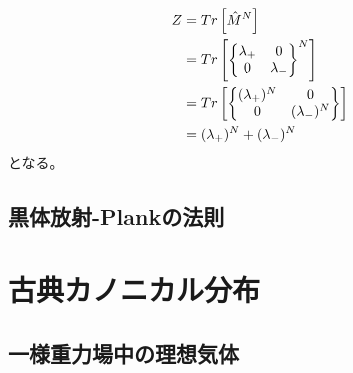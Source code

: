 \documentclass[dvipdfmx, 11pt, a4paper]{jsarticle}
\theoremstyle{definition}
\begin{document}
    \begin{align}
        Z &= Tr\left[ \hat{M}^N \right] \notag \\
        &= Tr \left[ \left\{
        \begin{matrix}
            \lambda_+ &0\\
            0&\lambda_-
        \end{matrix} 
        \right\}^N \right] \notag \\
        &= Tr \left[ \left\{
        \begin{matrix}
            (\lambda_+)^N &0\\
            0&(\lambda_-)^N
        \end{matrix} 
        \right\} \right] \notag \\
        &= (\lambda_+)^N + (\lambda_-)^N
    \end{align}
    となる。
\subsection{黒体放射-Plankの法則}
\section{古典カノニカル分布}
\subsection{一様重力場中の理想気体}
\end{document}
